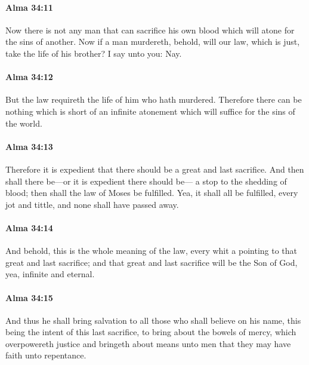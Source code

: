 		\paragraph{Alma 34:11} %
			\label{ALMA-34-11}

			Now there is not any man that can sacrifice his own blood
			which will atone for the sins of another.
			Now if a man murdereth,
			behold, will our law, which is just, take the life of his brother?
			I say unto you: Nay.

		\paragraph{Alma 34:12} %
			\label{ALMA-34-12}

			But the law requireth the life of him who hath murdered.
			Therefore there can be nothing which is short of an infinite atonement
			which will suffice for the sins of the world.

		\paragraph{Alma 34:13} %
			\label{ALMA-34-13}

			Therefore it is expedient that there should be a great and last sacrifice.
			And then shall there be---or it is expedient there should be---
			a stop to the shedding of blood;
			then shall the law of Moses be fulfilled.
			Yea, it shall all be fulfilled, every jot and tittle,
			and none shall have passed away.

		\paragraph{Alma 34:14} %
			\label{ALMA-34-14}

			And behold, this is the whole meaning of the law,
			every whit a pointing to that great and last sacrifice;
			and that great and last sacrifice will be the Son of God,
			yea, infinite and eternal.

		\paragraph{Alma 34:15} %
			\label{ALMA-34-15}

			And thus he shall bring salvation to all those who shall believe on his name,
			this being the intent of this last sacrifice,
			to bring about the bowels of mercy, which overpowereth justice
			and bringeth about means unto men that they may have faith unto repentance.

